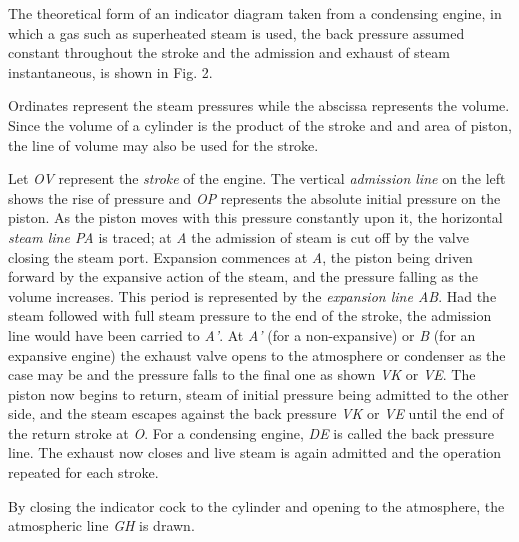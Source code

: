 \documentclass[11pt, a5paper]{book}
\begin{document}
The theoretical form of an indicator diagram taken from a condensing
engine, in which a gas such as superheated steam is used, the back
pressure assumed constant throughout the stroke and the admission and
exhaust of steam instantaneous, is shown in Fig. 2.\par

Ordinates represent the steam pressures while the abscissa represents
the volume.  Since the volume of a cylinder is the product of the
stroke and and area of piston, the line of volume may also be used for
the stroke.\par

Let \textit{OV} represent the \textit{stroke} of the engine.  The
vertical \textit{admission line} on the left shows the rise of
pressure and \textit{OP} represents the absolute initial pressure on
the piston.  As the piston moves with this pressure constantly upon
it, the horizontal \textit{steam line PA} is traced; at \textit{A} the
admission of steam is cut off by the valve closing the steam port.
Expansion commences at \textit{A}, the piston being driven forward by
the expansive action of the steam, and the pressure falling as the
volume increases.  This period is represented by the \textit{expansion
  line AB}.  Had the steam followed with full steam pressure to the
end of the stroke, the admission line would have been carried to
\textit{A'}.  At \textit{A'} (for a non-expansive) or \textit{B} (for
an expansive engine) the exhaust valve opens to the atmosphere or
condenser as the case may be and the pressure falls to the final one
as shown \textit{VK} or \textit{VE}.  The piston now begins to return,
steam of initial pressure being admitted to the other side, and the
steam escapes against the back pressure \textit{VK} or \textit{VE}
until the end of the return stroke at \textit{O}.  For a condensing
engine, \textit{DE} is called the back pressure line.  The exhaust now
closes and live steam is again admitted and the operation repeated for
each stroke.\par

By closing the indicator cock to the cylinder and opening to the
atmosphere, the atmospheric line \textit{GH} is drawn.\par
\end{document}
